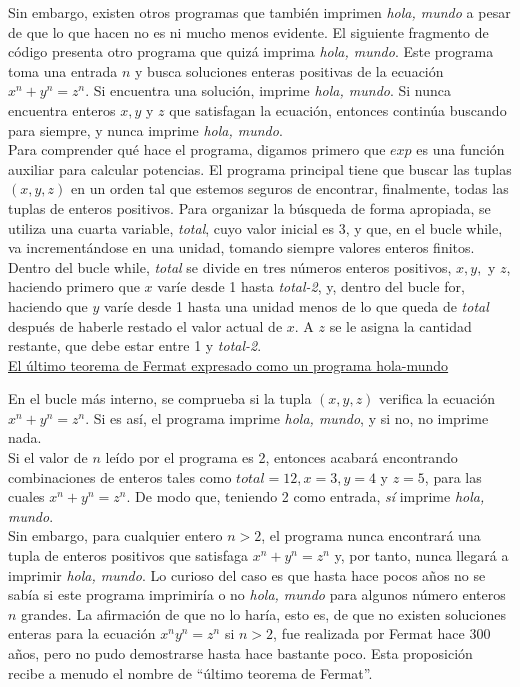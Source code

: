 

Sin embargo, existen otros programas que también imprimen \emph{hola, mundo} a pesar de que lo que hacen no es ni mucho menos evidente. El siguiente fragmento de código presenta otro programa que quizá imprima \emph{hola, mundo}. Este programa toma una entrada $n$ y busca soluciones enteras positivas de la ecuación $x^n + y^n = z^n$. Si encuentra una solución, imprime \emph{hola, mundo}. Si nunca encuentra enteros $x, y$ y $z$ que satisfagan la ecuación, entonces continúa buscando para siempre, y nunca imprime \emph{hola, mundo}.\\

Para comprender qué hace el programa, digamos primero que $exp$ es una función auxiliar para calcular potencias. El programa principal tiene que buscar las tuplas $(x,y,z)$ en un orden tal que estemos seguros de encontrar, finalmente, todas las tuplas de enteros positivos. Para organizar la búsqueda de forma apropiada, se utiliza una cuarta variable, \emph{total}, cuyo valor inicial es 3, y que, en el bucle while, va incrementándose en una unidad, tomando siempre valores enteros finitos. Dentro del bucle while, \emph{total} se divide en tres números enteros positivos, $x, y,$ y $z$, haciendo primero que $x$ varíe desde 1 hasta \emph{total-2}, y, dentro del bucle for, haciendo que $y$ varíe desde 1 hasta una unidad menos de lo que queda de \emph{total} después de haberle restado el valor actual de $x$. A $z$ se le asigna la cantidad restante, que debe estar entre 1 y \emph{total-2}.\\

\underline{El último teorema de Fermat expresado como un programa hola-mundo}


En el bucle más interno, se comprueba si la tupla $(x,y,z)$ verifica la ecuación $x^n + y^n = z^n$. Si es así, el programa imprime \emph{hola, mundo}, y si no, no imprime nada.\\

Si el valor de $n$ leído por el programa es 2, entonces acabará encontrando combinaciones de enteros tales como $total = 12, x = 3, y = 4$ y $z = 5$, para las cuales $x^n + y^n = z^n$. De modo que, teniendo 2 como entrada, \emph{sí} imprime \emph{hola, mundo}.\\

Sin embargo, para cualquier entero $n > 2$, el programa nunca encontrará una tupla de enteros positivos que satisfaga $x^n + y^n = z^n$ y, por tanto, nunca llegará a imprimir \emph{hola, mundo}. Lo curioso del caso es que hasta hace pocos años no se sabía si este programa imprimiría o no \emph{hola, mundo} para algunos número enteros $n$ grandes. La afirmación de que no lo haría, esto es, de que no existen soluciones enteras para la ecuación $x^n y^n = z^n$ si $n > 2$, fue realizada por Fermat hace 300 años, pero no pudo demostrarse hasta hace bastante poco. Esta proposición recibe a menudo el nombre de ``último teorema de Fermat''.\\

